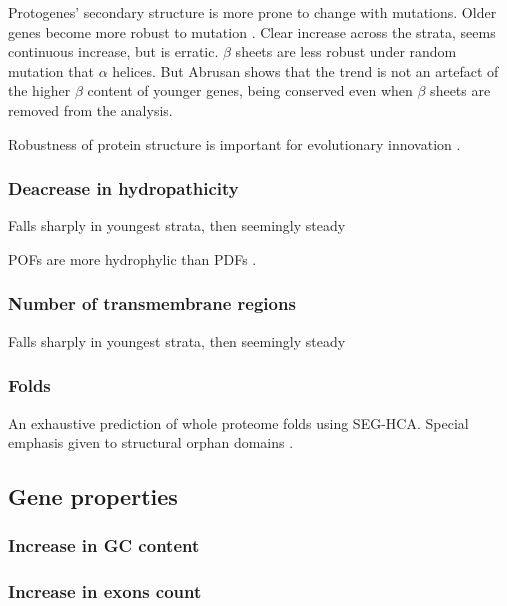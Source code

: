     Protogenes' secondary structure is more prone to change with
    mutations.  Older genes become more robust to mutation
    \cite{abrusan_integration_2013}. Clear increase across the strata,
    seems continuous increase, but is erratic. $\beta$ sheets are less
    robust under random mutation that $\alpha$ helices. But Abrusan
    shows that the trend is not an artefact of the higher $\beta$
    content of younger genes, being conserved even when $\beta$ sheets
    are removed from the analysis.

    Robustness of protein structure is important for evolutionary
    innovation \cite{bloom_structural_2006, bloom_protein_2006,
    bloom_evolution_2007}.


  \subsubsection{Deacrease in hydropathicity}

    Falls sharply in youngest strata, then seemingly steady
    \cite{carvunis_proto-genes_2012}

    POFs are more hydrophylic than PDFs \cite{gollery_what_2006}.

  \subsubsection{Number of transmembrane regions}

    Falls sharply in youngest strata, then seemingly steady
    \cite{carvunis_proto-genes_2012}
    

  \subsubsection{Folds}

    An exhaustive prediction of whole proteome folds using SEG-HCA. Special
    emphasis given to structural orphan domains \cite{faure_comprehensive_2013}.

\subsection{Gene properties} \subsubsection{Increase in GC content}
\subsubsection{Increase in exons count}


